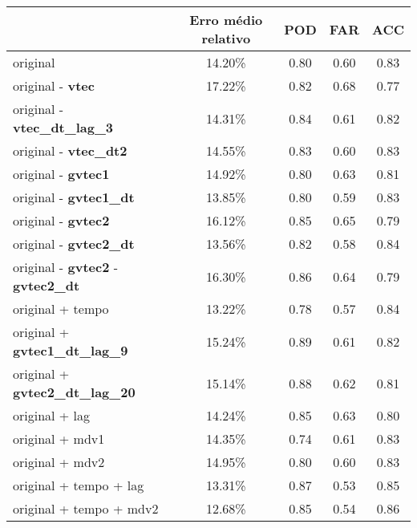\begin{table}
\begin{center}
\begin{tabular}{|l|c|c|c|c|} 
\hline
	                          & Erro médio relativo	& POD	& FAR	& ACC  \\ \hline
original                                                & 14.20\% &  0.80  & 0.60  & 0.83 \\ \hline
original - {\bf vtec}                                   & 17.22\% &  0.82  & 0.68  & 0.77 \\ \hline
original - {\bf vtec\_dt\_lag\_3}                       & 14.31\% &  0.84  & 0.61  & 0.82 \\ \hline
original - {\bf vtec\_dt2}                              & 14.55\% &  0.83  & 0.60  & 0.83 \\ \hline
original - {\bf gvtec1}                                 & 14.92\% &  0.80  & 0.63  & 0.81 \\ \hline
original - {\bf gvtec1\_dt}                             & 13.85\% &  0.80  & 0.59  & 0.83 \\ \hline
original - {\bf gvtec2}                                 & 16.12\% &  0.85  & 0.65  & 0.79 \\ \hline
original - {\bf gvtec2\_dt}                             & 13.56\% &  0.82  & 0.58  & 0.84 \\ \hline
original - {\bf gvtec2} - {\bf gvtec2\_dt}              & 16.30\% &  0.86  & 0.64  & 0.79 \\ \hline
original + tempo                                        & 13.22\% &  0.78  & 0.57  & 0.84 \\ \hline
original + {\bf gvtec1\_dt\_lag\_9}                     & 15.24\% &  0.89  & 0.61  & 0.82 \\ \hline
original + {\bf gvtec2\_dt\_lag\_20}                    & 15.14\% &  0.88  & 0.62  & 0.81 \\ \hline
original + lag                                          & 14.24\% &  0.85  & 0.63  & 0.80 \\ \hline
original + mdv1                                         & 14.35\% &  0.74  & 0.61  & 0.83 \\ \hline
original + mdv2                                         & 14.95\% &  0.80  & 0.60  & 0.83 \\ \hline
original + tempo + lag                                  & 13.31\% &  0.87  & 0.53  & 0.85 \\ \hline
original + tempo + mdv2                                 & 12.68\% &  0.85  & 0.54  & 0.86 \\ \hline

\end{tabular}
\end{center}
\end{table}
